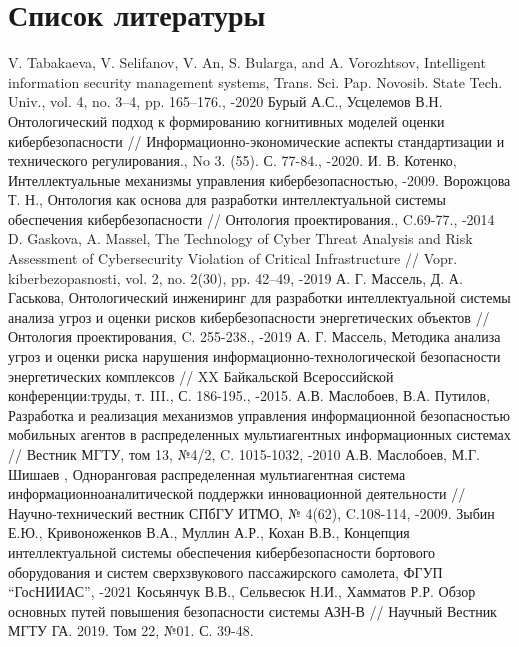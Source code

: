 \section{Список литературы}
\medskip

\begin{thebibliography}{}
V. Tabakaeva, V. Selifanov, V. An, S. Bularga, and A. Vorozhtsov,
Intelligent information security management systems,  Trans. Sci. Pap. Novosib. State Tech. Univ., vol. 4,
no. 3–4, pp. 165–176., -2020
Бурый А.С., Усцелемов В.Н. Онтологический подход к формированию когнитивных моделей оценки
кибербезопасности // Информационно-экономические аспекты стандартизации и технического
регулирования.,  No 3. (55). С. 77-84., -2020.
И. В. Котенко, Интеллектуальные механизмы управления кибербезопасностью, -2009.
Ворожцова Т. Н., Онтология как основа для разработки интеллектуальной системы обеспечения
кибербезопасности // Онтология проектирования., C.69-77., -2014
D. Gaskova, A. Massel, The Technology of Cyber Threat Analysis and Risk Assessment of Cybersecurity
Violation of Critical Infrastructure // Vopr. kiberbezopasnosti, vol. 2, no. 2(30), pp. 42–49, -2019
А. Г. Массель, Д. А. Гаськова, Онтологический инжениринг для разработки интеллектуальной системы анализа угроз
и оценки рисков кибербезопасности энергетических объектов // Онтология проектирования, C. 255-238., -2019
А. Г. Массель, Методика анализа угроз и оценки риска нарушения информационно-технологической
безопасности энергетических комплексов // XX Байкальской Всероссийской конференции:труды,
т. III., С. 186-195., -2015.
А.В. Маслобоев, В.А. Путилов, Разработка и реализация механизмов управления информационной безопасностью
мобильных агентов в распределенных мультиагентных информационных системах // Вестник МГТУ, том 13, №4/2,
C. 1015-1032, -2010
А.В. Маслобоев, М.Г. Шишаев ,  Одноранговая распределенная мультиагентная система
информационноаналитической поддержки инновационной деятельности //
Научно-технический вестник СПбГУ ИТМО, № 4(62), C.108-114, -2009.
Зыбин Е.Ю., Кривоноженков В.А., Муллин А.Р., Кохан В.В., Концепция
интеллектуальной системы обеспечения кибербезопасности бортового оборудования
и систем сверхзвукового пассажирского самолета, ФГУП ``ГосНИИАС'', -2021
Косьянчук В.В., Сельвесюк Н.И., Хамматов Р.Р. Обзор основных путей повышения безопасности системы АЗН-В
// Научный Вестник МГТУ ГА. 2019. Том 22, №01. С. 39-48.

\end{thebibliography}
